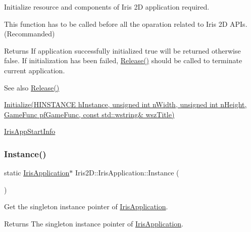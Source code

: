 Initialize resource and components of Iris 2D application required. 

This function has to be called before all the oparation related to Iris 2D A\+P\+Is. (Recommanded) \begin{DoxyReturn}{Returns}
If application successfully initialized true will be returned otherwise false. If initialization has been failed, \hyperlink{class_iris2_d_1_1_iris_application_a486d999a8d9e96f21b9d064d10d15b96}{Release()} should be called to terminate current application. 
\end{DoxyReturn}
\begin{DoxySeeAlso}{See also}
\hyperlink{class_iris2_d_1_1_iris_application_a486d999a8d9e96f21b9d064d10d15b96}{Release()} 

\hyperlink{class_iris2_d_1_1_iris_application_a84f3ddebb3a3ffb0c172bd41fb952e1a}{Initialize(\+H\+I\+N\+S\+T\+A\+N\+C\+E h\+Instance, unsigned int n\+Width, unsigned int n\+Height, Game\+Func pf\+Game\+Func, const std\+::wstring\& wsz\+Title)} 

\hyperlink{struct_iris2_d_1_1_iris_application_1_1_iris_app_start_info}{Iris\+App\+Start\+Info} 
\end{DoxySeeAlso}
\mbox{\label{class_iris2_d_1_1_iris_application_ab2a9826c10d90732f398859782817f8e}} 
\subsubsection{\texorpdfstring{Instance()}{Instance()}}
{\footnotesize\ttfamily static \hyperlink{class_iris2_d_1_1_iris_application}{Iris\+Application}$\ast$ Iris2\+D\+::\+Iris\+Application\+::\+Instance (\begin{DoxyParamCaption}{ }\end{DoxyParamCaption})\hspace{0.3cm}{\ttfamily [static]}}



Get the singleton instance pointer of \hyperlink{class_iris2_d_1_1_iris_application}{Iris\+Application}. 

\begin{DoxyReturn}{Returns}
The singleton instance pointer of \hyperlink{class_iris2_d_1_1_iris_application}{Iris\+Application}. 
\end{DoxyReturn}
\mbox{\label{class_iris2_d_1_1_iris_application_ab7a5b7f956f23d3fb3d2ee0de573cb53}} 
